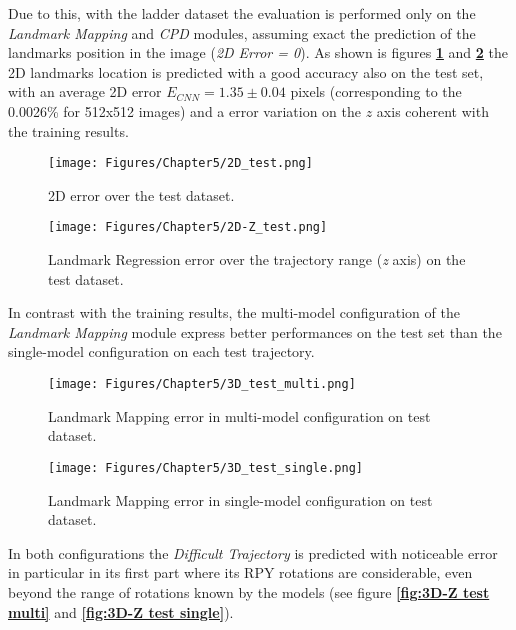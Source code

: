 Due to this, with the ladder dataset the evaluation is performed only on the \textit{Landmark Mapping} and \textit{CPD} modules, assuming exact the prediction of the landmarks position in the image (\textit{2D Error = 0}).
\newpage
As shown is figures \textbf{\ref{fig:2D test}} and \textbf{\ref{fig:2D-Z test}} the 2D landmarks location is predicted with a good accuracy also on the test set, with an average 2D error $E_{CNN} = 1.35 \pm 0.04$ pixels (corresponding to the 0.0026\% for 512x512 images) and a error variation on the $z$ axis coherent with the training results. 

\begin{figure}[H]
    \centering
    \texttt{[image: Figures/Chapter5/2D\_test.png]}
    \caption[2D error over the test dataset.]{2D error over the test dataset.}
    \label{fig:2D test}
\end{figure}

\begin{figure}[H]
    \centering
    \texttt{[image: Figures/Chapter5/2D-Z\_test.png]}
    \caption[Landmark Regression error on test dataset]{Landmark Regression error over the trajectory range (\textit{z} axis) on the test dataset.}
    \label{fig:2D-Z test}
\end{figure}

\newpage
In contrast with the training results, the multi-model configuration of the \textit{Landmark Mapping} module express better performances on the test set than the single-model configuration on each test trajectory.

\begin{figure}[H]
    \centering
    \texttt{[image: Figures/Chapter5/3D\_test\_multi.png]}
    \caption[Landmark Mapping error in multi-model configuration on test dataset.]{Landmark Mapping error in multi-model configuration on test dataset.}
    \label{fig:3D test multi}
\end{figure}

\begin{figure}[H]
    \centering
    \texttt{[image: Figures/Chapter5/3D\_test\_single.png]}
    \caption[Landmark Mapping error in single-model configuration on test dataset.]{Landmark Mapping error in single-model configuration on test dataset.}
    \label{fig:3D test single}
\end{figure}
\newpage
In both configurations the \textit{Difficult Trajectory} is predicted with noticeable error in particular in its first part where its RPY rotations are considerable, even beyond the range of rotations known by the models (see figure \textbf{\ref{fig:3D-Z test multi}} and \textbf{\ref{fig:3D-Z test single}}).

